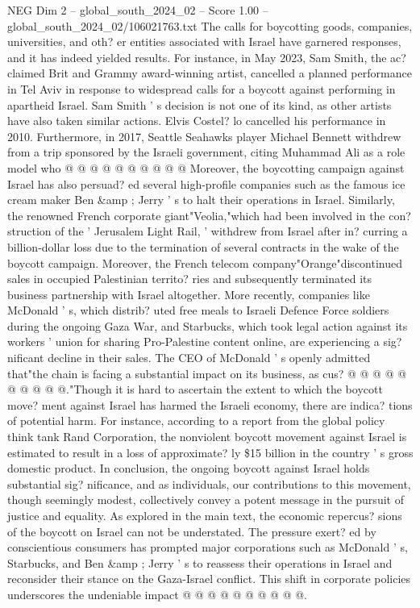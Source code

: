 \begin{textsample}{NEG Dim 2 – global\_south\_2024\_02 – Score 1.00 – global\_south\_2024\_02/106021763.txt}
The calls for boycotting goods, companies, universities, and oth? er entities associated with Israel have garnered responses, and it has indeed yielded results.
For instance, in May 2023, Sam Smith, the ac? claimed Brit and Grammy award-winning artist, cancelled a planned performance in Tel Aviv in response to widespread calls for a boycott against performing in apartheid Israel.
Sam Smith ' s decision is not one of its kind, as other artists have also taken similar actions.
Elvis Costel? lo cancelled his performance in 2010.
Furthermore, in 2017, Seattle Seahawks player Michael Bennett withdrew from a trip sponsored by the Israeli government, citing Muhammad Ali as a role model who @ @ @ @ @ @ @ @ @ @ Moreover, the boycotting campaign against Israel has also persuad? ed several high-profile companies such as the famous ice cream maker Ben \&amp ; Jerry ' s to halt their operations in Israel.
Similarly, the renowned French corporate giant"Veolia,"which had been involved in the con? struction of the ' Jerusalem Light Rail, ' withdrew from Israel after in? curring a billion-dollar loss due to the termination of several contracts in the wake of the boycott campaign.
Moreover, the French telecom company"Orange"discontinued sales in occupied Palestinian territo? ries and subsequently terminated its business partnership with Israel altogether.
More recently, companies like McDonald ' s, which distrib? uted free meals to Israeli Defence Force soldiers during the ongoing Gaza War, and Starbucks, which took legal action against its workers ' union for sharing Pro-Palestine content online, are experiencing a sig? nificant decline in their sales.
The CEO of McDonald ' s openly admitted that"the chain is facing a substantial impact on its business, as cus? @ @ @ @ @ @ @ @ @ @."Though it is hard to ascertain the extent to which the boycott move? ment against Israel has harmed the Israeli economy, there are indica? tions of potential harm.
For instance, according to a report from the global policy think tank Rand Corporation, the nonviolent boycott movement against Israel is estimated to result in a loss of approximate? ly \$15 billion in the country ' s gross domestic product.
In conclusion, the ongoing boycott against Israel holds substantial sig? nificance, and as individuals, our contributions to this movement, though seemingly modest, collectively convey a potent message in the pursuit of justice and equality.
As explored in the main text, the economic repercus? sions of the boycott on Israel can not be understated.
The pressure exert? ed by conscientious consumers has prompted major corporations such as McDonald ' s, Starbucks, and Ben \&amp ; Jerry ' s to reassess their operations in Israel and reconsider their stance on the Gaza-Israel conflict.
This shift in corporate policies underscores the undeniable impact @ @ @ @ @ @ @ @ @ @.

\end{textsample}
